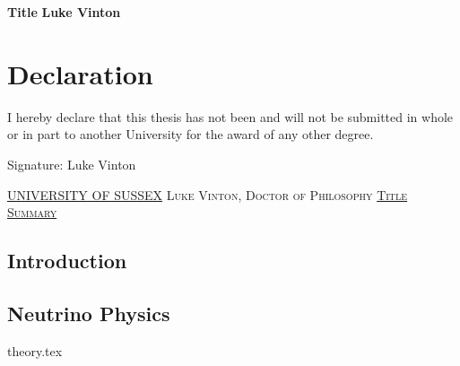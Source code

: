 \documentclass[a4paper,11pt]{report}
\begin{document}


\thispagestyle{empty}
\begin{flushright}
\end{flushright}	
\vskip40mm
\begin{center}
\huge\textbf{Title}
\vskip2mm
\Large\textbf{Luke Vinton}
\normalsize
\end{center}
%
%
\chapter*{Declaration}
I hereby declare that this thesis has not been and will not be submitted in whole or in part to another University for the award of any
other degree.
	

\vskip5mm
Signature:
\vskip20mm
Luke Vinton
%
%
\thispagestyle{empty}
\newpage
\null\vskip10mm
\begin{center}
\large
\underline{UNIVERSITY OF SUSSEX}
\vskip20mm
\textsc{Luke Vinton, Doctor of Philosophy}
\vskip20mm
\underline{\textsc{Title}}
\vskip0mm
\vskip20mm
\underline{\textsc{Summary}}
\vskip2mm
\end{center}
\renewcommand{\baselinestretch}{1.0}








\begin{abstract}



\end{abstract}
\newpage{}


\section{Introduction}


\section{Neutrino Physics}
{theory.tex}
\end{document}
